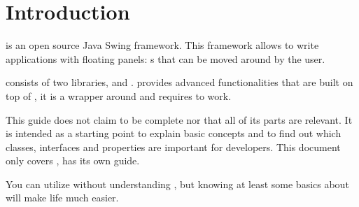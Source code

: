 \section{Introduction}

 is an open source Java Swing framework. This framework allows to write applications with floating panels: s that can be moved around by the user.

 consists of two libraries,  and .  provides advanced functionalities that are built on top of , it is a wrapper around  and requires  to work.

This guide does not claim to be complete nor that all of its parts are relevant. It is intended as a starting point to explain basic concepts and to find out which classes, interfaces and properties are important for developers. This document only covers ,  has its own guide. 

You can utilize  without understanding , but knowing at least some basics about  will make life much easier.
